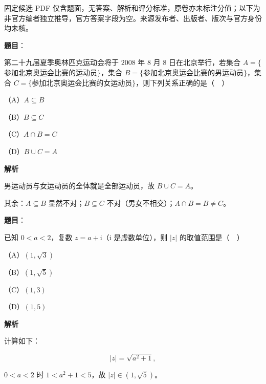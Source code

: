 

\begin{gktip}
固定候选 PDF 仅含题面，无答案、解析和评分标准，原卷亦未标注分值；以下为非官方编者独立推导，官方答案字段为空。来源发布者、出版者、版次与官方身份均未核。
\end{gktip}

\begin{answer}

\textbf{题目}：

第二十九届夏季奥林匹克运动会将于 $2008$ 年 $8$ 月 $8$ 日在北京举行，若集合 $A=\{$参加北京奥运会比赛的运动员$\}$，集合 $B=\{$参加北京奥运会比赛的男运动员$\}$，集合 $C=\{$参加北京奥运会比赛的女运动员$\}$，则下列关系正确的是（　）

（A）$A\subseteq B$

（B）$B\subseteq C$

（C）$A\cap B=C$

（D）$B\cup C=A$

\textbf{解析}

男运动员与女运动员的全体就是全部运动员，故 $B\cup C=A$。

其余：$A\subseteq B$ 显然不对；$B\subseteq C$ 不对（男女不相交）；$A\cap B=B\ne C$。


\end{answer}
\begin{answer}

\textbf{题目}：

已知 $0<a<2$，复数 $z=a+\mathrm i$（$\mathrm i$ 是虚数单位），则 $|z|$ 的取值范围是（　）

（A）$(1,\sqrt3)$

（B）$(1,\sqrt5)$

（C）$(1,3)$

（D）$(1,5)$

\textbf{解析}

计算如下：

\nopagebreak[4]
\[|z|=\sqrt{a^2+1},\]

$0<a<2$ 时 $1<a^2+1<5$，故 $|z|\in(1,\sqrt5)$。


\end{answer}
